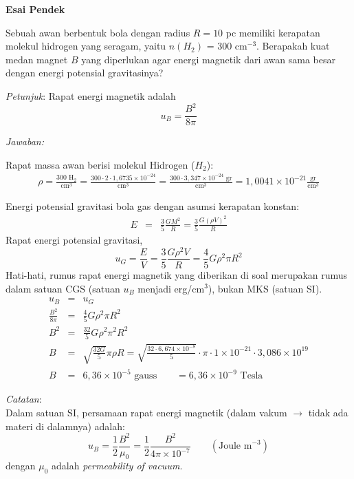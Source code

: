 \documentclass[11pt,fleqn]{exam}
\begin{document}
\begin{questions}
\vspace{1cm}
\textbf{Esai Pendek}

\question Sebuah awan berbentuk bola dengan radius $R = 10$ pc memiliki kerapatan molekul hidrogen yang seragam, yaitu $n(H_2)$ = 300 cm$^{-3}$. Berapakah kuat medan magnet $B$ yang diperlukan agar energi magnetik dari awan sama besar dengan energi potensial gravitasinya?

\textit{Petunjuk}: Rapat energi magnetik adalah
$$u_{B} = \frac{B^2}{8\pi}$$


\textit{Jawaban: }

Rapat massa awan berisi molekul Hidrogen ($H_2$):
\begin{eqnarray*}
\rho = \frac{300 \text{  H}_2}{\text{cm}^{3}} = \frac{300 \cdot 2 \cdot 1,6735 \times 10^{-24}}{\text{cm}^{3}} =  \frac{300 \cdot 3,347 \times 10^{-24} \text{  gr}}{\text{cm}^{3}} = 1,0041\times 10^{-21} \frac{\text{gr}}{\text{cm}^3}
\end{eqnarray*}

Energi potensial gravitasi bola gas dengan asumsi kerapatan konstan:
\begin{eqnarray*}
E &=& \frac{3}{5}\frac{GM^2}{R} = \frac{3}{5} \frac{G (\rho V)^2}{R}
\end{eqnarray*}
Rapat energi potensial gravitasi,
\begin{equation*}
u_G = \frac{E}{V} = \frac{3}{5} \frac{G\rho^2 V}{R} = \frac{4}{5} G\rho^2 \pi R^2
\end{equation*}
Hati-hati, rumus rapat energi magnetik yang diberikan di soal merupakan rumus dalam satuan CGS (satuan $u_B$ menjadi erg/cm$^3$), bukan MKS (satuan SI).
\begin{eqnarray*}
u_B &=& u_G \\
\frac{B^2}{8 \pi} &=& \frac{4}{5} G \rho^2 \pi R^2\\
B^2 &=& \frac{32}{5} G \rho^2 \pi^2 R^2\\
B &=& \sqrt{\frac{32 G}{5}} \pi \rho R = \sqrt{\frac{32 \cdot 6,674 \times 10^{-8}}{5}} \cdot \pi \cdot 1 \times 10^{-21} \cdot 3,086 \times 10^{19} \\
B &=& 6,36 \times 10^{-5} \text{   gauss} \qquad = 6,36 \times 10^{-9} \text{  Tesla}
\end{eqnarray*}

\textit{Catatan}: \\
Dalam satuan SI, persamaan rapat energi magnetik (dalam vakum $\rightarrow$ tidak ada materi di dalamnya) adalah:
\begin{equation*}
u_B = \frac{1}{2}\frac{B^2}{\mu_0} = \frac{1}{2}\frac{B^2}{4 \pi \times 10^{-7}} \qquad (\text{Joule m}^{-3})
\end{equation*}
dengan $\mu_0$ adalah \textit{permeability of vacuum}.


\end{questions}
\end{document}

